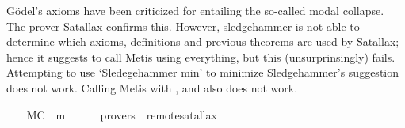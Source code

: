 %
\begin{isabellebody}%
\def\isabellecontext{GoedelGodModalCollapse}%
%
\isadelimtheory
%
\endisadelimtheory
%
\isatagtheory
%
\endisatagtheory
{\isafoldtheory}%
%
\isadelimtheory
%
\endisadelimtheory
%
\isamarkuptrue%
%
\begin{isamarkuptext}%
G\"odel's axioms have been criticized for entailing the so-called 
modal collapse. The prover Satallax \cite{Satallax} confirms this. 
However, sledgehammer is not able to determine which axioms, 
definitions and previous theorems are used by Satallax;
hence it suggests to call Metis using everything, but this (unsurprinsingly) fails.
Attempting to use `Sledegehammer min' to minimize Sledgehammer's suggestion does not work.
Calling Metis with ,  and  also does not work.%
\end{isamarkuptext}%
\isamarkuptrue%
\ \ \isamarkupfalse%
\ MC{\isacharcolon}\ {\isachardoublequoteopen}{\isacharbrackleft}{\isasymforall}{\isacharparenleft}{\isasymlambda}{\isasymPhi}{\isachardot}{\isacharparenleft}{\isasymPhi}\ m{\isasymrightarrow}\ {\isacharparenleft}{\isasymbox}\ {\isasymPhi}{\isacharparenright}{\isacharparenright}{\isacharparenright}{\isacharbrackright}{\isachardoublequoteclose}\isanewline
\ \ \isamarkupfalse%
\ {\isacharbrackleft}provers\ {\isacharequal}\ remote{\isacharunderscore}satallax{\isacharbrackright}%
\isadelimproof
\ %
\endisadelimproof
%
\isatagproof
{}\isamarkupfalse%
\isanewline
\ \ %
\endisatagproof
{\isafoldproof}%
%
\isadelimproof
%
\endisadelimproof
%
\isadelimtheory
%
\endisadelimtheory
%
\isatagtheory
%
\endisatagtheory
{\isafoldtheory}%
%
\isadelimtheory
%
\endisadelimtheory
\end{isabellebody}%
